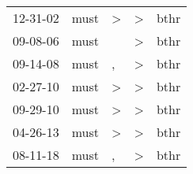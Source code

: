 \begin{supertabular}{p{0.07\textwidth}p{0.06\textwidth}p{0.02\textwidth}p{0.02\textwidth}p{0.06\textwidth}}
 12-31-02\textsuperscript{} &  must\textsuperscript{} &  \textgreater &  \textgreater &  bthr\textsuperscript{} \\
 09-08-06\textsuperscript{} &  must\textsuperscript{} &               &  \textgreater &  bthr\textsuperscript{} \\
 09-14-08\textsuperscript{} &  must\textsuperscript{} &             , &  \textgreater &  bthr\textsuperscript{} \\
 02-27-10\textsuperscript{} &  must\textsuperscript{} &  \textgreater &  \textgreater &  bthr\textsuperscript{} \\
 09-29-10\textsuperscript{} &  must\textsuperscript{} &  \textgreater &  \textgreater &  bthr\textsuperscript{} \\
 04-26-13\textsuperscript{} &  must\textsuperscript{} &  \textgreater &  \textgreater &  bthr\textsuperscript{} \\
 08-11-18\textsuperscript{} &  must\textsuperscript{} &             , &  \textgreater &  bthr\textsuperscript{} \\
\end{supertabular}
